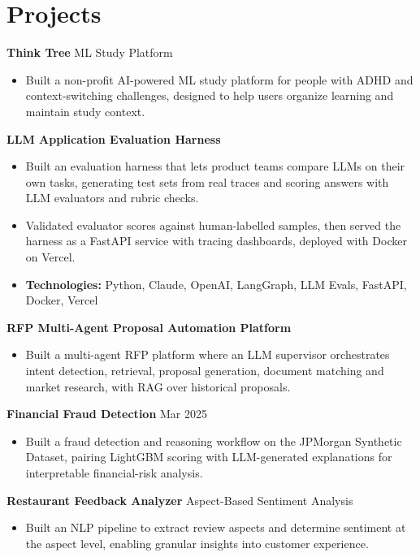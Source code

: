 \documentclass[10pt,a4paper]{article}
\begin{document}
\section{Projects}
\textbf{Think Tree} \textbar{} ML Study Platform\par
\begin{itemize}
  \item Built a non-profit AI-powered ML study platform for people with ADHD and context-switching challenges, designed to help users organize learning and maintain study context.
\end{itemize}
\textbf{LLM Application Evaluation Harness}\par
\begin{itemize}
  \item Built an evaluation harness that lets product teams compare LLMs on their own tasks, generating test sets from real traces and scoring answers with LLM evaluators and rubric checks.
  \item Validated evaluator scores against human-labelled samples, then served the harness as a FastAPI service with tracing dashboards, deployed with Docker on Vercel.
  \item \textbf{Technologies:} Python, Claude, OpenAI, LangGraph, LLM Evals, FastAPI, Docker, Vercel
\end{itemize}
\textbf{RFP Multi-Agent Proposal Automation Platform}\par
\begin{itemize}
  \item Built a multi-agent RFP platform where an LLM supervisor orchestrates intent detection, retrieval, proposal generation, document matching and market research, with RAG over historical proposals.
\end{itemize}
\textbf{Financial Fraud Detection} \textbar{} Mar 2025\par
\begin{itemize}
  \item Built a fraud detection and reasoning workflow on the JPMorgan Synthetic Dataset, pairing LightGBM scoring with LLM-generated explanations for interpretable financial-risk analysis.
\end{itemize}
\textbf{Restaurant Feedback Analyzer} \textbar{} Aspect-Based Sentiment Analysis\par
\begin{itemize}
  \item Built an NLP pipeline to extract review aspects and determine sentiment at the aspect level, enabling granular insights into customer experience.
\end{itemize}
\end{document}

